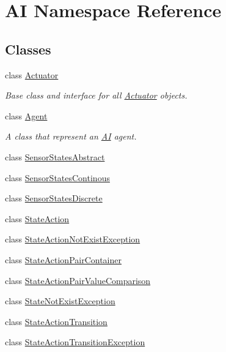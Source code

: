 \hypertarget{namespaceAI}{\section{A\-I Namespace Reference}
\label{namespaceAI}
}
\subsection*{Classes}
\begin{DoxyCompactItemize}
\item 
class \hyperlink{classAI_1_1Actuator}{Actuator}
\begin{DoxyCompactList}\small\item\em Base class and interface for all \hyperlink{classAI_1_1Actuator}{Actuator} objects. \end{DoxyCompactList}\item 
class \hyperlink{classAI_1_1Agent}{Agent}
\begin{DoxyCompactList}\small\item\em A class that represent an \hyperlink{namespaceAI}{A\-I} agent. \end{DoxyCompactList}\item 
class \hyperlink{classAI_1_1SensorStatesAbstract}{Sensor\-States\-Abstract}
\item 
class \hyperlink{classAI_1_1SensorStatesContinous}{Sensor\-States\-Continous}
\item 
class \hyperlink{classAI_1_1SensorStatesDiscrete}{Sensor\-States\-Discrete}
\item 
class \hyperlink{classAI_1_1StateAction}{State\-Action}
\item 
class \hyperlink{classAI_1_1StateActionNotExistException}{State\-Action\-Not\-Exist\-Exception}
\item 
class \hyperlink{classAI_1_1StateActionPairContainer}{State\-Action\-Pair\-Container}
\item 
class \hyperlink{classAI_1_1StateActionPairValueComparison}{State\-Action\-Pair\-Value\-Comparison}
\item 
class \hyperlink{classAI_1_1StateNotExistException}{State\-Not\-Exist\-Exception}
\item 
class \hyperlink{classAI_1_1StateActionTransition}{State\-Action\-Transition}
\item 
class \hyperlink{classAI_1_1StateActionTransitionException}{State\-Action\-Transition\-Exception}
\end{DoxyCompactItemize}
